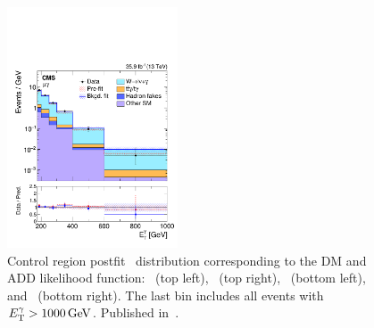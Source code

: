 \begin{figure}[htbp]
\begin{center}
    \includegraphics[width=0.45\textwidth]{figures/exo16053/Figure_005-d.pdf}
    \caption{
      Control region postfit \ETgamma\ distribution corresponding to the DM and ADD likelihood function:
      \Pe\Pe\Pgamma\ (top left), \Pmu\Pmu\Pgamma\ (top right), \Pe\Pgamma\ (bottom left), and
      \Pmu\Pgamma\ (bottom right). The last bin includes all events with $\ETgamma > 1000\unit{GeV}$.
      Published in~\cite{ref:JHEP02(2019)074}.
    }
    \label{fig:postfitDM_CR}
  \end{center}
\end{figure}

